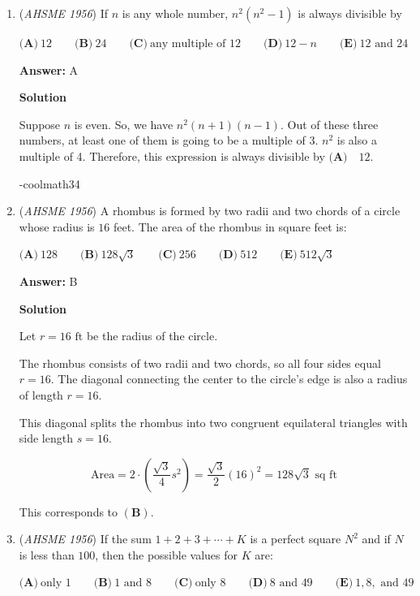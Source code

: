 \begin{enumerate}
	\item (\textit{AHSME 1956}) If $n$ is any whole number, $n^2(n^2 - 1)$ is always divisible by 


 $\textbf{(A)}\ 12\qquad \textbf{(B)}\ 24\qquad \textbf{(C)}\ \text{any multiple of }12\qquad \textbf{(D)}\ 12-n\qquad \textbf{(E)}\ 12\text{ and }24$

 \textbf{Answer: }A



\textbf{Solution}

Suppose $n$ is even. So, we have $n^2(n+1)(n-1).$ Out of these three numbers, at least one of them is going to be a multiple of 3. $n^2$ is also a multiple of 4. Therefore, this expression is always divisible by $\boxed{\textbf{(A)} \quad 12}.$

 -coolmath34

 


	\item (\textit{AHSME 1956}) A rhombus is formed by two radii and two chords of a circle whose radius is $16$ feet. The area of the rhombus in square feet is: 


 $\textbf{(A)}\ 128\qquad \textbf{(B)}\ 128\sqrt{3}\qquad \textbf{(C)}\ 256\qquad \textbf{(D)}\ 512\qquad \textbf{(E)}\ 512\sqrt{3}$

 \textbf{Answer: }B



\textbf{Solution}

Let $r = 16\text{ ft}$ be the radius of the circle.

 The rhombus consists of two radii and two chords, so all four sides equal $r = 16$. The diagonal connecting the center to the circle's edge is also a radius of length $r = 16$. 

 This diagonal splits the rhombus into two congruent equilateral triangles with side length $s = 16$.

 
 \[\text{Area} = 2 \cdot \left(\frac{\sqrt{3}}{4} s^2\right) = \frac{\sqrt{3}}{2} (16)^2 = 128\sqrt{3}\text{ sq ft}\]

 This corresponds to $\mathbf{(B)}$.

 


	\item (\textit{AHSME 1956}) If the sum $1 + 2 + 3 + \cdots + K$ is a perfect square $N^2$ and if $N$ is less than $100$, then the possible values for $K$ are: 


 $\textbf{(A)}\ \text{only }1\qquad \textbf{(B)}\ 1\text{ and }8\qquad \textbf{(C)}\ \text{only }8\qquad \textbf{(D)}\ 8\text{ and }49\qquad \textbf{(E)}\ 1,8,\text{ and }49$


\end{enumerate}

